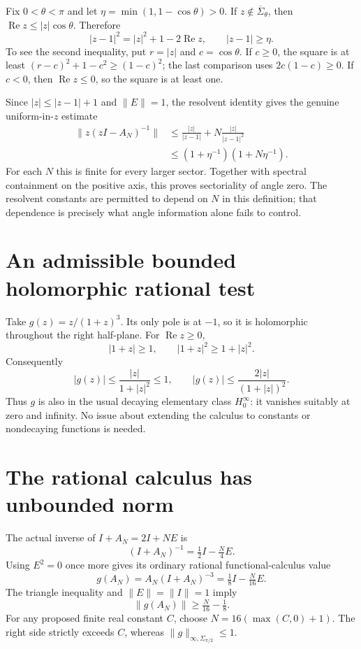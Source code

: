 \documentclass[11pt]{article}
\begin{document}
Fix $0<\theta<\pi$ and let
$\eta=\min(1,1-\cos\theta)>0$. If
$z\notin\overline\Sigma_\theta$, then
$\operatorname{Re}z\leq|z|\cos\theta$. Therefore
\[
 |z-1|^2=|z|^2+1-2\operatorname{Re}z,
                         \qquad |z-1|\geq\eta.
\]
To see the second inequality, put $r=|z|$ and
$c=\cos\theta$. If $c\geq0$, the square is at least
$(r-c)^2+1-c^2\geq(1-c)^2$; the last comparison uses
$2c(1-c)\geq0$. If $c<0$, then
$\operatorname{Re}z\leq0$, so the square is at least one.

Since $|z|\leq|z-1|+1$ and $\|E\|=1$, the resolvent
identity gives the genuine uniform-in-$z$ estimate
\begin{align*}
 \|z(zI-A_N)^{-1}\|
  &\leq\frac{|z|}{|z-1|}
           +N\frac{|z|}{|z-1|^2}\\
  &\leq(1+\eta^{-1})(1+N\eta^{-1}).
\end{align*}
For each $N$ this is finite for every larger sector.
Together with spectral containment on the positive
axis, this proves sectoriality of angle zero.
The resolvent constants are permitted to depend on
$N$ in this definition; that dependence is precisely
what angle information alone fails to control.

\section*{An admissible bounded holomorphic rational test}
Take $g(z)=z/(1+z)^3$. Its only pole is at $-1$, so it
is holomorphic throughout the right half-plane.
For $\operatorname{Re}z\geq0$,
\[
 |1+z|\geq1,\qquad
 |1+z|^2\geq1+|z|^2.
\]
Consequently
\[
 |g(z)|\leq\frac{|z|}{1+|z|^2}\leq1,
 \qquad
 |g(z)|\leq\frac{2|z|}{(1+|z|)^2}.
\]
Thus $g$ is also in the usual decaying elementary
class $H_0^\infty$: it vanishes suitably at zero and
infinity. No issue about extending the calculus to
constants or nondecaying functions is needed.

\newpage
\section*{The rational calculus has unbounded norm}
The actual inverse of $I+A_N=2I+NE$ is
\[
               (I+A_N)^{-1}=\tfrac12I-\tfrac N4E.
\]
Using $E^2=0$ once more gives its ordinary rational
functional-calculus value
\[
             g(A_N)=A_N(I+A_N)^{-3}
                         =\tfrac18I-\tfrac N{16}E.
\]
The triangle inequality and $\|E\|=\|I\|=1$ imply
\[
                    \|g(A_N)\|\geq\tfrac N{16}-\tfrac18.
\]
For any proposed finite real constant $C$, choose
$N=16(\max(C,0)+1)$. The right side strictly exceeds
$C$, whereas $\|g\|_{\infty,\Sigma_{\pi/2}}\leq1$.
\end{document}
